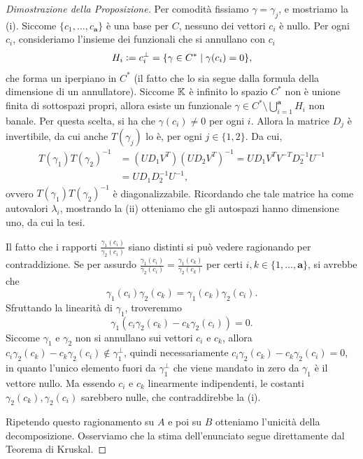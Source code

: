 \begin{proof}[Dimostrazione della Proposizione]
	Per comodità fissiamo $ \gamma = \gamma_{j} $, e mostriamo la (i). Siccome $ \{c_1, \ldots, c_{\bm{a}}\}  $ è una base per $ C $, nessuno dei vettori $
		c_{i} $ è nullo. Per ogni $ c_{i} $, consideriamo l'insieme dei funzionali che si annullano con $
		c_{i} $
	\begin{equation*}
		H_{i} \vcentcolon= c_{i}^\perp =  \{\gamma \in C^* \mid \gamma(c_{i}) = 0\},
	\end{equation*}
	che forma un iperpiano in $ C^* $ (il fatto che lo sia segue dalla formula della dimensione di un
	annullatore). Siccome $ \mathbb{K}
	$ è infinito lo spazio $ C^* $ non è unione finita di
	sottospazi propri, allora esiste un funzionale $ \gamma \in C^* \setminus
		\bigcup_{i=1}^{\bm{a}} H_{i}$ non banale. Per
	questa scelta, si ha che $ \gamma(c_{i}) \neq  0$ per ogni $ i $.
	Allora la matrice $ D_{j} $ è invertibile, da cui anche $ T(\gamma_{j}) $ lo è, per ogni $ j \in \{1,2\} $.
	Da cui,
	\begin{equation*}
		\begin{aligned}
			T(\gamma_1)T(\gamma_2)^{-1} & = \left( UD_1V^T \right)\left( UD_2V^T \right)^{-1} =
			UD_1V^TV^{-T}D_2^{-1}U^{-1}                                                         \\
			                            & = UD_1D_2^{-1}U^{-1},
		\end{aligned}
	\end{equation*}
	ovvero $ T(\gamma_1)T(\gamma_2)^{-1} $ è diagonalizzabile. Ricordando che tale
	matrice ha come autovalori $ \lambda_{i} $, mostrando la (ii) otteniamo che gli
	autospazi hanno dimensione uno, da cui la tesi.

	Il fatto che i rapporti $ \frac{\gamma_1(c_{i})}{\gamma_{2}(c_{i})} $ siano distinti si può vedere
	ragionando per contraddizione. Se per assurdo $
		\frac{\gamma_1(c_{i})}{\gamma_{2}(c_{i})} = \frac{\gamma_1(c_{k})}{\gamma_{2}(c_{k})} $ per certi $
		i,k \in \{1, \ldots, \bm{a}\}  $, si avrebbe che
	\begin{equation*}
		\gamma_1(c_i) \gamma_2(c_{k}) = \gamma_1(c_{k}) \gamma_2(c_{i}).
	\end{equation*}
	Sfruttando la linearità di $ \gamma_1 $, troveremmo
	\begin{equation*}
		\gamma_1 \left( c_{i}\gamma_2(c_{k}) - c_{k}\gamma_2(c_{i}) \right) = 0.
	\end{equation*}
	Siccome $ \gamma_1 $ e $ \gamma_2 $ non si annullano sui vettori $ c_{i} $ e $ c_{k} $, allora $
		c_{i}\gamma_2(c_{k}) - c_{k}\gamma_2(c_{i}) \not\in \gamma_{1}^\perp $, quindi necessariamente $
		c_{i}\gamma_2(c_{k}) - c_{k}\gamma_2(c_{i}) = 0 $, in quanto l'unico elemento fuori da $
		\gamma_1^\perp $ che viene mandato in zero da $ \gamma_1 $ è il vettore nullo. Ma essendo $ c_{i} $ e $ c_{k} $ linearmente
	indipendenti, le costanti $ \gamma_2(c_{k}),\gamma_2(c_{i}) $ sarebbero nulle, che contraddirebbe
	la (i).

	Ripetendo questo
	ragionamento su $ A $ e poi su $ B $ otteniamo l'unicità della decomposizione. Osserviamo che la stima
	dell'enunciato segue direttamente dal Teorema di Kruskal.
\end{proof}


